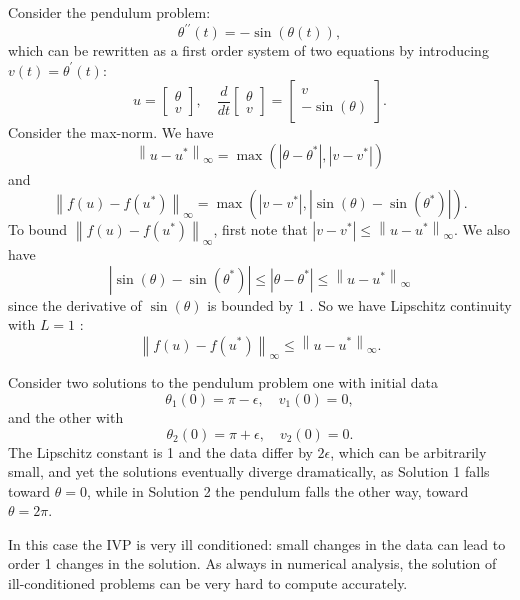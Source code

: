 \begin{example}
\label{eg: Pendulum problem}
Consider the pendulum problem: 
\[
    \theta ^{\prime \prime}(t) = -\sin(\theta (t)), 
\]
which can be rewritten as a first order system of two equations by introducing $ v(t) = \theta ^\prime (t) $: 
\[
    u=\left[\begin{array}{l}
        \theta \\
        v
        \end{array}\right], \quad \frac{d}{d t}\left[\begin{array}{l}
        \theta \\
        v
        \end{array}\right]=\left[\begin{array}{c}
        v \\
        -\sin (\theta)
        \end{array}\right] .
\]
Consider the max-norm. We have
$$
\left\|u-u^*\right\|_{\infty}=\max \left(\left|\theta-\theta^*\right|,\left|v-v^*\right|\right)
$$
and
$$
\left\|f(u)-f\left(u^*\right)\right\|_{\infty}=\max \left(\left|v-v^*\right|,\left|\sin (\theta)-\sin \left(\theta^*\right)\right|\right) .
$$
To bound $\left\|f(u)-f\left(u^*\right)\right\|_{\infty}$, first note that $\left|v-v^*\right| \leq\left\|u-u^*\right\|_{\infty}$. We also have
$$
\left|\sin (\theta)-\sin \left(\theta^*\right)\right| \leq\left|\theta-\theta^*\right| \leq\left\|u-u^*\right\|_{\infty}
$$
since the derivative of $\sin (\theta)$ is bounded by 1 . So we have Lipschitz continuity with $L=1$ :
$$
\left\|f(u)-f\left(u^*\right)\right\|_{\infty} \leq\left\|u-u^*\right\|_{\infty} .
$$

Consider two solutions to the pendulum problem  one with initial data
$$
\theta_1(0)=\pi-\epsilon, \quad v_1(0)=0,
$$
and the other with $$
\theta_2(0)=\pi+\epsilon, \quad v_2(0)=0 .
$$
The Lipschitz constant is 1 and the data differ by $2 \epsilon$, which can be arbitrarily small, and yet the solutions eventually diverge dramatically, as Solution 1 falls toward $\theta=0$, while in Solution 2 the pendulum falls the other way, toward $\theta=2 \pi$.

In this case the IVP is very ill conditioned: small changes in the data can lead to order 1 changes in the solution. As always in numerical analysis, the solution of ill-conditioned problems can be very hard to compute accurately.
\end{example}
